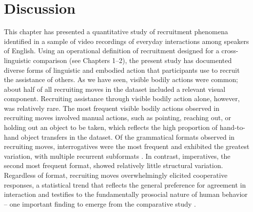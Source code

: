 \documentclass[output=paper,nonflat,modfont,draft]{langsci/langscibook}
\begin{document}
\section{Discussion}
This chapter has presented a quantitative study of recruitment phenomena identified in a sample of video recordings of everyday interactions among speakers of English. Using an operational definition of recruitment designed for a cross-linguistic comparison (see Chapters 1--2), the present study has documented diverse forms of linguistic and embodied action that participants use to recruit the assistance of others. As we have seen, visible bodily actions were common;  about half of all recruiting moves in the dataset included a relevant visual component. Recruiting assistance through visible bodily action alone, however, was relatively rare. The most frequent visible bodily actions observed in recruiting moves involved manual actions, such as pointing, reaching out, or holding out an object to be taken, which reflects the high proportion of hand-to-hand object transfers in the dataset. Of the grammatical formats observed in recruiting moves, interrogatives were the most frequent and exhibited the greatest variation, with multiple recurrent subformats \citep[see][]{fox_rethinking_2016, foxheinemann2017}. In contrast, imperatives, the second most frequent format, showed relatively little structural variation. Regardless of format, recruiting moves overwhelmingly elicited cooperative responses, a statistical trend that reflects the general preference for agreement in interaction \citep{Sacks1987} and testifies to the fundamentally prosocial nature of human behavior -- one important finding to emerge from the comparative study \citep{FloydEtAl2018}.
\end{document}
